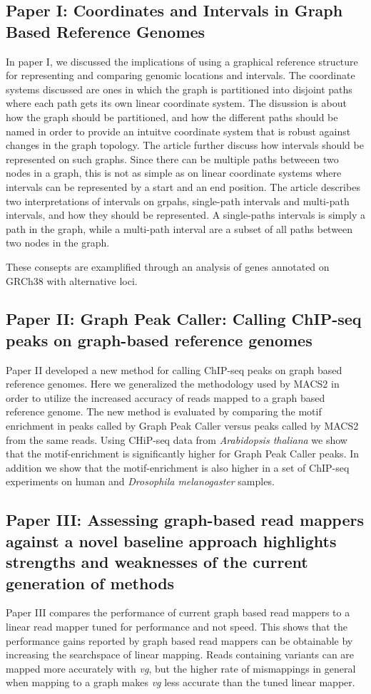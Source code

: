 \subsection*{Paper I: Coordinates and Intervals in Graph Based Reference Genomes}
In paper I, we discussed the implications of using a graphical reference structure for representing and comparing genomic locations and intervals.
The coordinate systems discussed are ones in which the graph is partitioned into disjoint paths where each path gets its own linear coordinate system.
The disussion is about how the graph should be partitioned, and how the different paths should be named in order to provide an intuitve coordinate system that is robust against changes in the graph topology. 
The article further discuss how intervals should be represented on such graphs.
Since there can be multiple paths betweeen two nodes in a graph, this is not as simple as on linear coordinate systems where intervals can be represented by a start and an end position.
The article describes two interpretations of intervals on grpahs, single-path intervals and multi-path intervals, and how they should be represented.
A single-paths intervals is simply a path in the graph, while a multi-path interval are a subset of all paths between two nodes in the graph. 

These consepts are examplified through an analysis of genes annotated on GRCh38 with alternative loci.


\subsection*{Paper II: Graph Peak Caller: Calling ChIP-seq peaks on graph-based reference genomes}
Paper II developed a new method for calling ChIP-seq peaks on graph based reference genomes.
Here we generalized the methodology used by MACS2 in order to utilize the increased accuracy of reads mapped to a graph based reference genome.
The new method is evaluated by comparing the motif enrichment in peaks called by Graph Peak Caller versus peaks called by MACS2 from the same reads.
Using CHiP-seq data from \emph{Arabidopsis thaliana} we show that the motif-enrichment is significantly higher for Graph Peak Caller peaks.
In addition we show that the motif-enrichment is also higher in a set of ChIP-seq experiments on human and \emph{Drosophila melanogaster} samples.

\subsection*{Paper III: Assessing graph-based read mappers against a novel baseline approach highlights strengths and weaknesses of the current generation of methods}
Paper III compares the performance of current graph based read mappers to a linear read mapper tuned for performance and not speed.
This shows that the performance gains reported by graph based read mappers can be obtainable by increasing the searchspace of linear mapping.
Reads containing variants can are mapped more accurately with \emph{vg}, but the higher rate of mismappings in general when mapping to a graph makes \emph{vg} less accurate than the tuned linear mapper.

